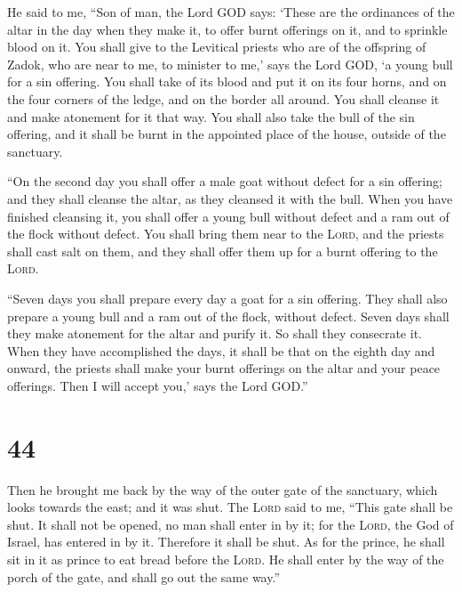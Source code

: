  He said to me, ``Son of man, the Lord GOD says: `These
are the ordinances of the altar in the day when they make it, to offer
burnt offerings on it, and to sprinkle blood on it.  You
shall give to the Levitical priests who are of the offspring of Zadok,
who are near to me, to minister to me,' says the Lord GOD, `a young bull
for a sin offering.  You shall take of its blood and put
it on its four horns, and on the four corners of the ledge, and on the
border all around. You shall cleanse it and make atonement for it that
way.  You shall also take the bull of the sin offering,
and it shall be burnt in the appointed place of the house, outside of
the sanctuary.

 ``On the second day you shall offer a male goat without
defect for a sin offering; and they shall cleanse the altar, as they
cleansed it with the bull.  When you have finished
cleansing it, you shall offer a young bull without defect and a ram out
of the flock without defect.  You shall bring them near
to the \textsc{Lord}, and the priests shall cast salt on them, and they
shall offer them up for a burnt offering to the \textsc{Lord}.

 ``Seven days you shall prepare every day a goat for a
sin offering. They shall also prepare a young bull and a ram out of the
flock, without defect.  Seven days shall they make
atonement for the altar and purify it. So shall they consecrate it.
 When they have accomplished the days, it shall be that
on the eighth day and onward, the priests shall make your burnt
offerings on the altar and your peace offerings. Then I will accept
you,' says the Lord GOD.''

\hypertarget{section-43}{%
\section{44}\label{section-43}}

 Then he brought me back by the way of the outer gate of
the sanctuary, which looks towards the east; and it was shut.
 The \textsc{Lord} said to me, ``This gate shall be shut.
It shall not be opened, no man shall enter in by it; for the
\textsc{Lord}, the God of Israel, has entered in by it. Therefore it
shall be shut.  As for the prince, he shall sit in it as
prince to eat bread before the \textsc{Lord}. He shall enter by the way
of the porch of the gate, and shall go out the same way.''


